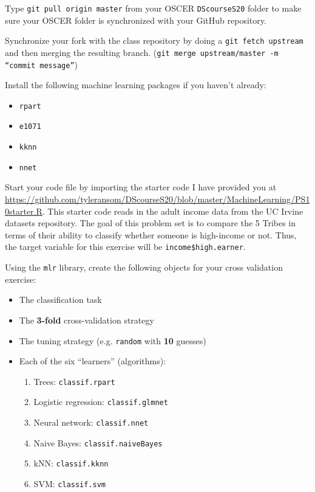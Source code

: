 \documentclass[12pt,english]{exam}
\begin{document}
\begin{questions}
\question Type \texttt{git pull origin master} from your OSCER \texttt{DScourseS20} folder to make sure your OSCER folder is synchronized with your GitHub repository. 

\question Synchronize your fork with the class repository by doing a \texttt{git fetch upstream} and then merging the resulting branch. (\texttt{git merge upstream/master -m ``commit message''})

\question Install the following machine learning packages if you haven't already:
\begin{itemize}
    \item \texttt{rpart}
    \item \texttt{e1071}
    \item \texttt{kknn}
    \item \texttt{nnet}
\end{itemize}

\question Start your code file by importing the starter code I have provided you at \url{https://github.com/tyleransom/DScourseS20/blob/master/MachineLearning/PS10starter.R}. This starter code reads in the adult income data from the UC Irvine datasets repository. The goal of this problem set is to compare the 5 Tribes in terms of their ability to classify whether someone is high-income or not. Thus, the target variable for this exercise will be \texttt{income\$high.earner}. 

\question Using the \texttt{mlr} library, create the following objects for your cross validation exercise:
\begin{itemize}
\item The classification task
\item The \textbf{3-fold} cross-validation strategy
\item The tuning strategy (e.g. \texttt{random} with \textbf{10} guesses)
\item Each of the six ``learners'' (algorithms):
    \begin{enumerate}
    \item Trees: \texttt{classif.rpart}
    \item Logistic regression: \texttt{classif.glmnet}    
    \item Neural network: \texttt{classif.nnet}      
    \item Naive Bayes: \texttt{classif.naiveBayes}
    \item kNN: \texttt{classif.kknn}       
    \item SVM: \texttt{classif.svm}       
    \end{enumerate}


\end{itemize}
\end{questions}
\end{document}

